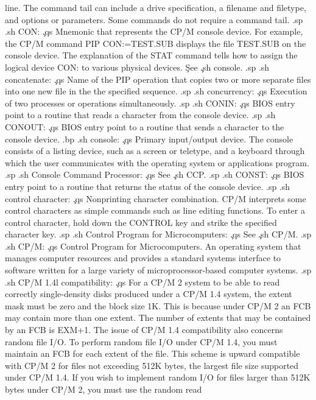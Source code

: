 line.  The command tail can include a drive specification, a 
filename and filetype, and options or parameters.  Some 
commands do not require a command tail.
.sp
.sh
CON:  \c
.qs
Mnemonic that represents the CP/M console device.
For example, the CP/M command PIP CON:=TEST.SUB displays the 
file TEST.SUB on the console device.  The explanation of the STAT 
command tells how to assign the logical device CON: to various 
physical devices.  \c
See \c
.sh
console.
.sp
.sh
concatenate:  \c
.qs
Name of the PIP operation that copies two or more separate files 
into one new file in the the specified sequence.
.sp
.sh
concurrency:  \c
.qs
Execution of two processes or operations simultaneously.
.sp
.sh
CONIN:  \c
.qs
BIOS entry point to a routine that reads a character from the 
console device.
.sp
.sh
CONOUT:  \c
.qs
BIOS entry point to a routine that sends a character to the 
console device.
.bp
.sh
console:  \c
.qs
Primary input/output device.  The console consists of a listing 
device, such as a screen or teletype, and a keyboard through 
which the user communicates with the operating system or 
applications program.
.sp
.sh
Console Command Processor:  \c
.qs
See \c
.sh
CCP.
.sp
.sh
CONST:  \c
.qs
BIOS entry point to a routine that returns the status of the 
console device.
.sp
.sh
control character:  \c
.qs
Nonprinting character combination.  CP/M interprets some control 
characters as simple commands such as line editing functions.  To 
enter a control character, hold down the CONTROL key and strike 
the specified character key.
.sp
.sh
Control Program for Microcomputers:  \c
.qs
See \c
.sh
CP/M.
.sp
.sh
CP/M:  \c
.qs
Control Program for Microcomputers.  An operating system that 
manages computer resources and provides a standard systems 
interface to software written for a large variety of 
microprocessor-based computer systems.
.sp
.sh
CP/M 1.4l compatibility:  \c
.qs
For a CP/M 2 system to be able to read correctly single-density 
disks produced under a CP/M 1.4 system, the extent mask must be 
zero and the block size 1K.  This is because under CP/M 2 an FCB 
may contain more than one extent.  The number of extents that may 
be contained by an FCB is EXM+1.  The issue of CP/M 1.4 
compatibility also concerns random file I/O.  To perform random 
file I/O under CP/M 1.4, you must maintain an FCB for each extent 
of the file.  This scheme is upward compatible with CP/M 2 for 
files not exceeding 512K bytes, the largest file size supported 
under CP/M 1.4.  If you wish to implement random I/O for files 
larger than 512K bytes under CP/M 2, you must use the random read 
